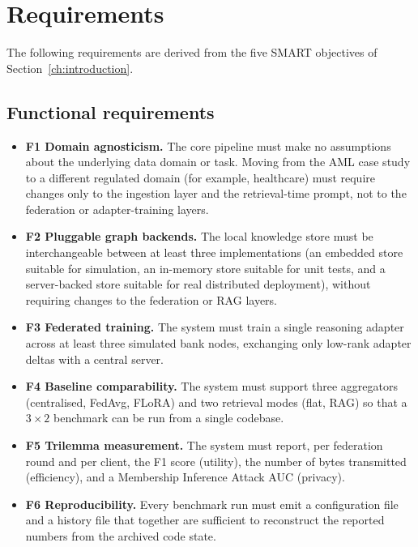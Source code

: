 \documentclass{report}
\begin{document}
\section{Requirements}
\label{sec:meth:requirements}

The following requirements are derived from the five SMART objectives of Section~\ref{ch:introduction}.

\subsection{Functional requirements}

\begin{itemize}
    \setlength\itemsep{0em}
    \item \textbf{F1 Domain agnosticism.} The core pipeline must make no assumptions about the underlying data domain or task. Moving from the AML case study to a different regulated domain (for example, healthcare) must require changes only to the ingestion layer and the retrieval-time prompt, not to the federation or adapter-training layers.
    \item \textbf{F2 Pluggable graph backends.} The local knowledge store must be interchangeable between at least three implementations (an embedded store suitable for simulation, an in-memory store suitable for unit tests, and a server-backed store suitable for real distributed deployment), without requiring changes to the federation or RAG layers.
    \item \textbf{F3 Federated training.} The system must train a single reasoning adapter across at least three simulated bank nodes, exchanging only low-rank adapter deltas with a central server.
    \item \textbf{F4 Baseline comparability.} The system must support three aggregators (centralised, FedAvg, FLoRA) and two retrieval modes (flat, RAG) so that a $3 \times 2$ benchmark can be run from a single codebase.
    \item \textbf{F5 Trilemma measurement.} The system must report, per federation round and per client, the F1 score (utility), the number of bytes transmitted (efficiency), and a Membership Inference Attack AUC (privacy).
    \item \textbf{F6 Reproducibility.} Every benchmark run must emit a configuration file and a history file that together are sufficient to reconstruct the reported numbers from the archived code state.
\end{itemize}
\end{document}
